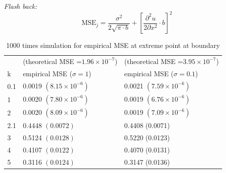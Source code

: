 \documentclass{article}
\begin{document}
\begin{itemize}
\textit{Flash back:}
$$\text{MSE}_j=  \frac{\sigma^2}{2\sqrt{\pi \cdot b}}  + \left[\frac{\partial^2 u}{2\partial x^2}\cdot b \right]^2$$

\begin{table}[H]
\centering
\begin{tabular}{l|l| l}
\hline\hline
& (theoretical MSE =$1.96\times 10^{-7}$) & (theoretical MSE =$3.95\times 10^{-7}$)\\
k & empirical MSE  ($\sigma=1$) &empirical MSE  ($\sigma=0.1$) \\\hline 
0.1&0.0019 $(8.15\times 10^{-6})$ & 0.0021 $(7.59\times 10^{-6})$\\
1 & 0.0020 $(7.80\times 10^{-6})$ &0.0019 $(6.76\times 10^{-6})$\\
2 & 0.0020 $(8.09\times 10^{-6})$ &0.0019 $(7.09\times 10^{-6})$\\
2.1 & 0.4448 $(0.0072)$ &0.4408 (0.0071)\\
3 & 0.5124 $(0.0128)$ & 0.5220 (0.0123)\\
4 & 0.4107 $(0.0122)$ & 0.4070 (0.0131)\\
5 & 0.3116 $(0.0124)$ & 0.3147 (0.0136)\\\hline
\end{tabular}
\caption{1000 times simulation for empirical MSE at extreme point at boundary}
\end{table}






\end{itemize}
\end{document}
